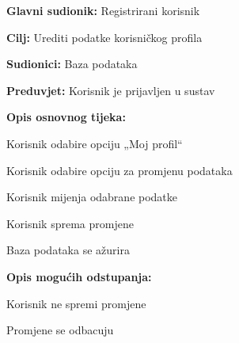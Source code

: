 				
				\noindent {}
				\begin{packed_item}
					
					\item \textbf{Glavni sudionik:} Registrirani korisnik
					\item  \textbf{Cilj:} Urediti podatke korisničkog profila
					\item  \textbf{Sudionici:} Baza podataka
					\item  \textbf{Preduvjet:} Korisnik je prijavljen u sustav
					\item  \textbf{Opis osnovnog tijeka:}
					
					\item[] \begin{packed_enum}
						
						\item Korisnik odabire opciju „Moj profil“
						\item Korisnik odabire opciju za promjenu podataka
						\item Korisnik mijenja odabrane podatke
						\item Korisnik sprema promjene
						\item Baza podataka se ažurira
					\end{packed_enum}
					
					\item  \textbf{Opis mogućih odstupanja:}
					
					\item[] \begin{packed_item}
						
						\item[4.a] Korisnik ne spremi promjene
						\item[] \begin{packed_enum}
							
							\item Promjene se odbacuju
							
						\end{packed_enum}
						
					\end{packed_item}
				\end{packed_item}
				
